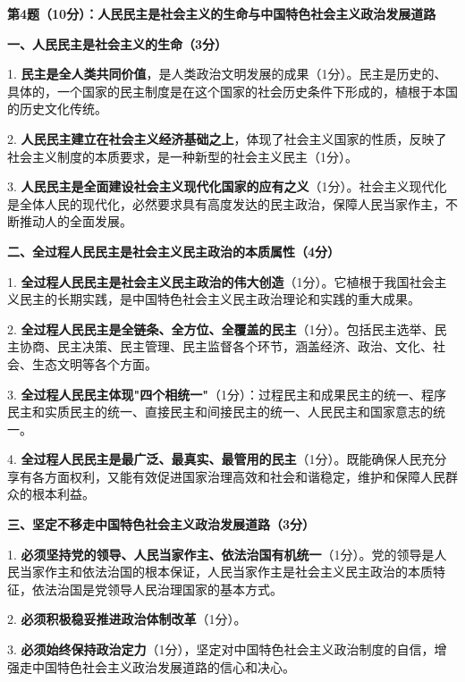 \documentclass[12pt, a4paper]{article}
\begin{document}
\begin{answerbox}

\textbf{第4题（10分）：人民民主是社会主义的生命与中国特色社会主义政治发展道路}

\textbf{一、人民民主是社会主义的生命（3分）}

1. \textbf{民主是全人类共同价值}，是人类政治文明发展的成果（1分）。民主是历史的、具体的，一个国家的民主制度是在这个国家的社会历史条件下形成的，植根于本国的历史文化传统。

2. \textbf{人民民主建立在社会主义经济基础之上}，体现了社会主义国家的性质，反映了社会主义制度的本质要求，是一种新型的社会主义民主（1分）。

3. \textbf{人民民主是全面建设社会主义现代化国家的应有之义}（1分）。社会主义现代化是全体人民的现代化，必然要求具有高度发达的民主政治，保障人民当家作主，不断推动人的全面发展。

\textbf{二、全过程人民民主是社会主义民主政治的本质属性（4分）}

1. \textbf{全过程人民民主是社会主义民主政治的伟大创造}（1分）。它植根于我国社会主义民主的长期实践，是中国特色社会主义民主政治理论和实践的重大成果。

2. \textbf{全过程人民民主是全链条、全方位、全覆盖的民主}（1分）。包括民主选举、民主协商、民主决策、民主管理、民主监督各个环节，涵盖经济、政治、文化、社会、生态文明等各个方面。

3. \textbf{全过程人民民主体现"四个相统一"}（1分）：过程民主和成果民主的统一、程序民主和实质民主的统一、直接民主和间接民主的统一、人民民主和国家意志的统一。

4. \textbf{全过程人民民主是最广泛、最真实、最管用的民主}（1分）。既能确保人民充分享有各方面权利，又能有效促进国家治理高效和社会和谐稳定，维护和保障人民群众的根本利益。

\textbf{三、坚定不移走中国特色社会主义政治发展道路（3分）}

1. \textbf{必须坚持党的领导、人民当家作主、依法治国有机统一}（1分）。党的领导是人民当家作主和依法治国的根本保证，人民当家作主是社会主义民主政治的本质特征，依法治国是党领导人民治理国家的基本方式。

2. \textbf{必须积极稳妥推进政治体制改革}（1分）。

3. \textbf{必须始终保持政治定力}（1分），坚定对中国特色社会主义政治制度的自信，增强走中国特色社会主义政治发展道路的信心和决心。

\end{answerbox}

\vspace{6pt}
\end{document}
